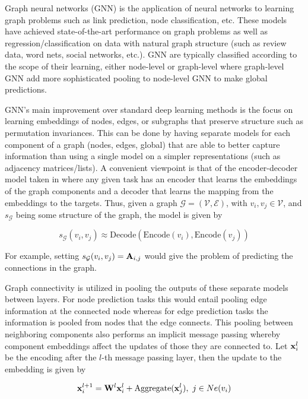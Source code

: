 
Graph neural networks (GNN) is the application of neural networks to learning graph problems such as link prediction, node classification, etc. These models have achieved state-of-the-art performance on graph problems as well as regression/classification on data with natural graph structure (such as review data, word nets, social networks, etc.). GNN are typically classified according to the scope of their learning, either node-level or graph-level where graph-level GNN add more sophisticated pooling to node-level GNN to make global predictions. 

GNN's main improvement over standard deep learning methods is the focus on learning embeddings of nodes, edges, or subgraphs that preserve structure such as permutation invariances. This can be done by having separate models for each component of a graph (nodes, edges, global) that are able to better capture information than using a single model on a simpler representations (such as adjacency matrices/lists). A convenient viewpoint is that of the encoder-decoder model taken in \cite{Hamilton2017} where any given task has an encoder that learns the embeddings of the graph components and a decoder that learns the mapping from the embeddings to the targets. Thus, given a graph $\mathcal{G} = (\mathcal{V}, \mathcal{E})$, with $v_i, v_j \in \mathcal{V}$, and $s_{\mathcal{G}}$ being some structure of the graph, the model is given by

\begin{equation}
s_{\mathcal{G}}(v_i, v_j) \approx \text{Decode}(\text{Encode}(v_i), \text{Encode}(v_j))
\end{equation}

For example, setting $s_{\mathcal{G}}(v_i, v_j) = \mVector{A}_{i,j}$ would give the problem of predicting the connections in the graph.

Graph connectivity is utilized in pooling the outputs of these separate models between layers. For node prediction tasks this would entail pooling edge information at the connected node whereas for edge prediction tasks the information is pooled from nodes that the edge connects. This pooling between neighboring components also performs an implicit message passing whereby component embeddings affect the updates of those they are connected to. Let $\mVector{x}_i^{l}$ be the encoding after the $l$-th message passing layer, then the update to the embedding is given by

\begin{equation}
\mVector{x}_i^{l+1} = \mVector{W}^{l}\mVector{x}_i^{l} + \text{Aggregate}(\mVector{x}_j^{l}),\ j \in Ne(v_i)
\end{equation}

